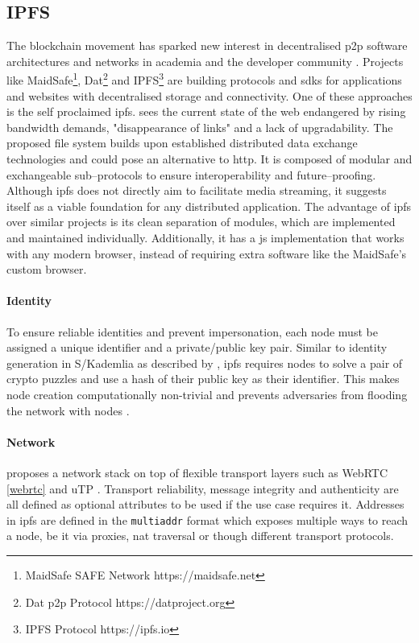 \subsection{IPFS}\label{chap:IPFS}

The blockchain movement has sparked new interest in decentralised \gls{p2p} software architectures and networks in academia and the developer community \cite{medium-dnets}. Projects like MaidSafe\footnote{MaidSafe SAFE Network https://maidsafe.net}, Dat\footnote{Dat \gls{p2p} Protocol https://datproject.org} and IPFS\footnote{IPFS Protocol https://ipfs.io} are building protocols and \glspl{sdk} for applications and websites with decentralised storage and connectivity. One of these approaches is the self proclaimed \gls{ipfs}. \citet[\S.1]{ipfs-whitepaper} sees the current state of the web endangered by rising bandwidth demands, "disappearance of links" and a lack of upgradability. The proposed file system builds upon established distributed data exchange technologies and could pose an alternative to \gls{http}. It is composed of modular and exchangeable sub–protocols to ensure interoperability and future–proofing. Although \gls{ipfs} does not directly aim to facilitate media streaming, it suggests itself as a viable foundation for any distributed application. The advantage of \gls{ipfs} over similar projects is its clean separation of modules, which are implemented and maintained individually. Additionally, it has a \gls{js} implementation that works with any modern browser, instead of requiring extra software like the MaidSafe's custom browser.

\paragraph{Identity}
To ensure reliable identities and prevent impersonation, each node must be assigned a unique identifier and a private/public key pair. Similar to identity generation in S/Kademlia as described by \citet[\S4.1]{s_kademlia}, \gls{ipfs} requires nodes to solve a pair of crypto puzzles and use a hash of their public key as their identifier. This makes node creation computationally non-trivial and prevents adversaries from flooding the network with nodes \cite[\S3.2]{s_kademlia}.

\paragraph{Network}
\citet[\S3.2]{ipfs-whitepaper} proposes a network stack on top of flexible transport layers such as WebRTC \ref{webrtc} and uTP \cite{utp-micro-torrent-transport-protocol}. Transport reliability, message integrity and authenticity are all defined as optional attributes to be used if the use case requires it. Addresses in \gls{ipfs} are defined in the \lstinline|multiaddr| format which exposes multiple ways to reach a node, be it via proxies, \gls{nat} traversal or though different transport protocols.

